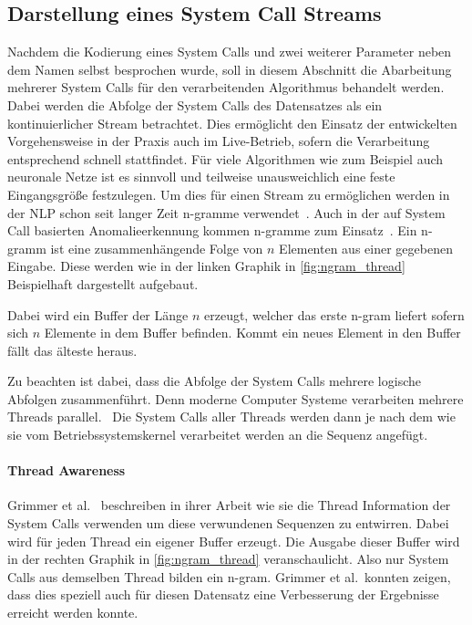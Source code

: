        \subsection{Darstellung eines System Call Streams}\label{sec:streamdarstellung}
            Nachdem die Kodierung eines System Calls und zwei weiterer Parameter neben dem Namen selbst besprochen wurde, soll in diesem Abschnitt die Abarbeitung mehrerer System Calls für den verarbeitenden Algorithmus behandelt werden.
            Dabei werden die Abfolge der System Calls des Datensatzes als ein kontinuierlicher Stream betrachtet.
            Dies ermöglicht den Einsatz der entwickelten Vorgehensweise in der Praxis auch im Live-Betrieb, sofern die Verarbeitung entsprechend schnell stattfindet.
            Für viele Algorithmen wie zum Beispiel auch neuronale Netze ist es sinnvoll und teilweise unausweichlich eine feste Eingangsgröße festzulegen.
            Um dies für einen Stream zu ermöglichen werden in der \ac{NLP} schon seit langer Zeit n-gramme verwendet~\cite{NGRAMSUEN1979}.
            Auch in der auf System Call basierten Anomalieerkennung kommen n-gramme zum Einsatz~\cite{STIDE_Alternatives, SYSCALL_GRAPHS, IDSTHREADGRIMMER2021}.
            Ein n-gramm ist eine zusammenhängende Folge von $n$ Elementen aus einer gegebenen Eingabe.
            Diese werden wie in der linken Graphik in \autoref{fig:ngram_thread} Beispielhaft dargestellt aufgebaut.

            Dabei wird ein Buffer der Länge $n$ erzeugt, welcher das erste n-gram liefert sofern sich $n$ Elemente in dem Buffer befinden.
            Kommt ein neues Element in den Buffer fällt das älteste heraus.

            Zu beachten ist dabei, dass die Abfolge der System Calls mehrere logische Abfolgen zusammenführt.
            Denn moderne Computer Systeme verarbeiten mehrere Threads parallel.~\cite{SYSCALL_SILBERSCHATZ}
            Die System Calls aller Threads werden dann je nach dem wie sie vom Betriebssystemskernel verarbeitet werden an die Sequenz angefügt.
            
            \paragraph{Thread Awareness}
                Grimmer et al.~\cite{IDSTHREADGRIMMER2021} beschreiben in ihrer Arbeit wie sie die Thread Information der System Calls verwenden um diese verwundenen Sequenzen zu entwirren.
                Dabei wird für jeden Thread ein eigener Buffer erzeugt. 
                Die Ausgabe dieser Buffer wird in der rechten Graphik in \autoref{fig:ngram_thread} veranschaulicht. 
                Also nur System Calls aus demselben Thread bilden ein n-gram.
                Grimmer et al.\ konnten zeigen, dass dies speziell auch für diesen Datensatz eine Verbesserung der Ergebnisse erreicht werden konnte.

